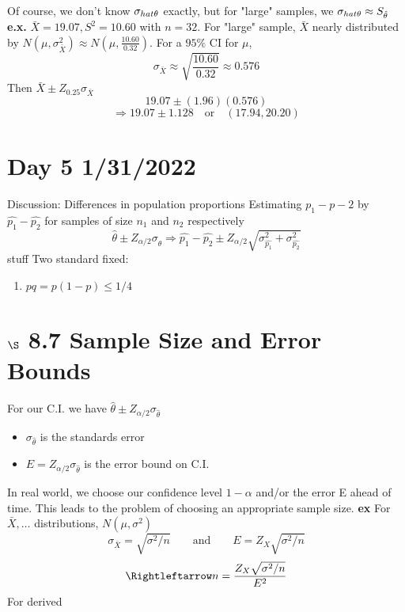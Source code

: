 \documentclass[12pt]{article}
\newcommand{\xbar}{\bar{X}}
\newcommand{\Ndef}{N\left(\mu, \sigma^2\right)} %
\begin{document}
           Of course, we don't know $\sigma_{\\hat{\theta}}$ exactly, but for "large" samples, we $\sigma_{\\hat{\theta}} \approx S_{\hat{\theta}}$
           \\
           \textbf{e.x.} $\xbar = 19.07, S^2 = 10.60$ with $n = 32$.
           For "large" sample, $\xbar$ nearly distributed by $N(\mu, \sigma^2_{\xbar}) \approx N(\mu, \frac{10.60}{0.32})$.
           For a $95\%$ CI for $\mu$,
           $$\sigma_{\xbar} \approx \sqrt{\frac{10.60}{0.32}} \approx 0.576$$
           Then $\xbar \pm Z_{0.25} \sigma_{\xbar}$
           $$19.07 \pm (1.96)(0.576)$$
           $$\Rightarrow 19.07 \pm 1.128 \quad \text{or} \quad (17.94, 20.20)$$
           \newpage
           \section*{Day 5 1/31/2022}
           Discussion: Differences in population proportions
           Estimating $p_1 - p-2$ by $\hat{p_1} - \hat{p_2}$ for samples of size $n_1$ and $n_2$ respectively
           $$\hat{\theta}\pm Z_{\alpha / 2} \sigma_{\hat{\theta}} \Rightarrow \hat{p_1} - \hat{p_2} \pm Z_{\alpha/2} \sqrt{\sigma_{\hat{p_1}}^2 + \sigma_{\hat{p_2}}^2 }$$
           stuff
           Two standard fixed:
           \begin{enumerate}
               \item $pq = p(1-p) \leq 1/4$
           \end{enumerate}
           
           \section*{$\S$ 8.7 Sample Size and Error Bounds}
           For our C.I. we have $\hat{\theta}\pm Z_{\alpha/2}\sigma_{\hat{\theta}}$
           \begin{itemize}
               \item $\sigma_{\hat{\theta}}$ is the standards error
               \item $E = Z_{\alpha/2}\sigma_{\hat{\theta}}$ is the error bound on C.I.
           \end{itemize}
           In real world, we choose our confidence level $1-\alpha$ and/or the error E ahead of time. This leads to the problem of choosing an appropriate sample size.
           \textbf{ex} For $\bar{X}, \dots$ distributions, $\Ndef$
           $$\sigma_{\xbar} = \sqrt{\sigma^2/n} \qquad \text{and} \qquad E = Z_X \sqrt{\sigma^2/n}$$
           $$\Rightleftarrow n = \frac{Z_X \sqrt{\sigma^2/n}}{E^2}$$
           For derived 
           
\end{document}
